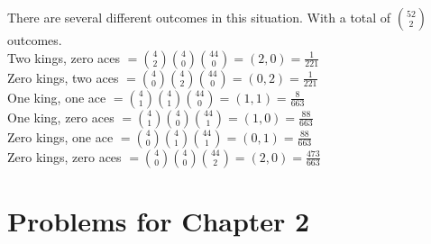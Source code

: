 \documentclass{article}
\begin{document}
\begin{enumerate}
\begin{enumerate}
        There are several different outcomes in this situation. With a total of $\binom{52}{2}$ outcomes.\\
        Two kings, zero aces $= \binom{4}{2}\binom{4}{0}\binom{44}{0}=(2, 0)=\frac{1}{221}$\\
        Zero kings, two aces $= \binom{4}{0}\binom{4}{2}\binom{44}{0}=(0, 2)=\frac{1}{221}$\\
        One king, one ace $=  \binom{4}{1}\binom{4}{1}\binom{44}{0}=(1, 1)=\frac{8}{663}$\\
        One king, zero aces $= \binom{4}{1}\binom{4}{0}\binom{44}{1}=(1, 0)=\frac{88}{663}$\\
        Zero kings, one ace $= \binom{4}{0}\binom{4}{1}\binom{44}{1}=(0, 1)=\frac{88}{663}$\\
        Zero kings, zero aces $= \binom{4}{0}\binom{4}{0}\binom{44}{2}=(2, 0)=\frac{473}{663}$
        
    \end{enumerate}
    
\end{enumerate}

\section{Problems for Chapter 2}
\end{document}
